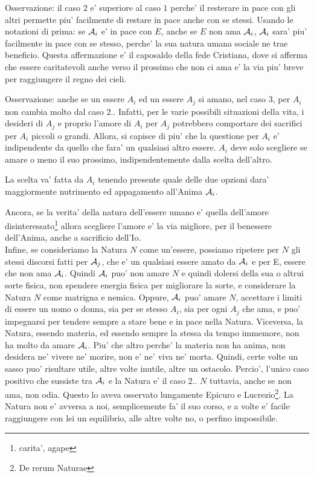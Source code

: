 Osservazione: il caso $2$ e' superiore al caso $1$ perche' il resterare in pace con gli altri permette piu' facilmente di restare in pace anche con se stessi. Usando le notazioni di prima: se $\mathcal{A}_i$ e' in pace con $E$, anche se $E$ non ama $\mathcal{A}_i$, $\mathcal{A}_i$ sara' piu' facilmente in pace con se stesso, perche' la sua natura umana sociale ne trae beneficio.
Questa affermazione e' il caposaldo della fede Cristiana, dove si afferma che essere caritatevoli anche verso il prossimo che non ci ama e' la via piu' breve per raggiungere il regno dei cieli.

Osservazione: anche se un essere $A_i$ ed un essere $A_j$ si amano, nel caso $3$, per $A_i$ non cambia molto dal caso $2.$. Infatti, per le varie possibili situazioni della vita, i desideri di $A_j$ e proprio l'amore di $A_i$ per $A_j$ potrebbero comportare dei sacrifici per $A_i$ piccoli o grandi. Allora, si capisce di piu' che la questione per $A_i$ e' indipendente da quello che fara' un qualsiasi altro essere. $A_i$ deve solo scegliere se amare o meno il suo prossimo, indipendentemente dalla scelta dell'altro.

La scelta va' fatta da $A_i$ tenendo presente quale delle due opzioni dara' maggiormente nutrimento ed appagamento all'Anima $\mathcal{A}_i$. 

Ancora, se la verita' della natura dell'essere umano e' quella dell'amore disinteressato\footnote{carita', agape} allora scegliere l'amore e' la via migliore, per il benessere dell'Anima, anche a sacrificio dell'Io. \\

Infine, se consideriamo la Natura $N$ come un'essere, possiamo ripetere per $N$ gli stessi discorsi fatti per $\mathcal{A}_j$, che e' un qualsiasi essere amato da $\mathcal{A}_i$ e per E, essere che non ama $\mathcal{A}_i$. Quindi $\mathcal{A}_i$ puo' non amare $N$ e quindi dolersi della sua o altrui sorte fisica, non spendere energia fisica per migliorare la sorte, e considerare la Natura $N$ come matrigna e nemica. Oppure, $\mathcal{A}_i$ puo' amare $N$, accettare i limiti di essere un uomo o donna, sia per se stesso $A_i$, sia per ogni $A_j$ che ama, e puo' impegnarsi per tendere sempre a stare bene e in pace nella Natura. Viceversa, la Natura, essendo materia, ed essendo sempre la stessa da tempo immemore, non ha molto da amare $\mathcal{A}_i$. Piu' che altro perche' la materia non ha anima, non desidera ne' vivere ne' morire, non e' ne' viva ne' morta. Quindi, certe volte un sasso puo' risultare utile, altre volte inutile, altre un ostacolo. Percio', l'unico caso positivo che sussiste tra $\mathcal{A}_i$ e la Natura e' il caso $2.$. $N$ tuttavia, anche se non ama, non odia. Questo lo aveva osservato lungamente Epicuro e Lucrezio\footnote{De rerum Naturae}. La Natura non e' avversa a noi, semplicemente fa' il suo corso, e a volte e' facile raggiungere con lei un equilibrio, alle altre volte no, o perfino impossibile. \\

